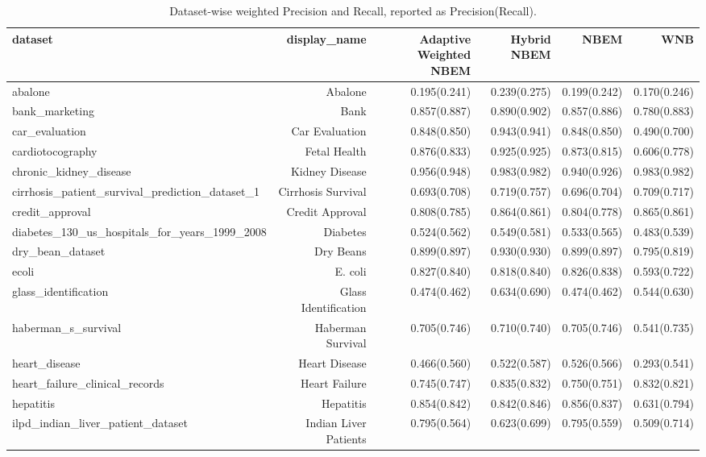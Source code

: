 \begin{table}[!htbp]
\centering
\scriptsize
\caption{Dataset-wise weighted Precision and Recall, reported as Precision(Recall).}
\label{tab:dataset_pr}
\begin{adjustbox}{max width=\textwidth}
\begin{tabular}{lrrrrr}
\toprule
dataset & display\_name & Adaptive Weighted NBEM & Hybrid NBEM & NBEM & WNB \\
\midrule
abalone & Abalone & 0.195(0.241) & 0.239(0.275) & 0.199(0.242) & 0.170(0.246) \\
bank\_marketing & Bank & 0.857(0.887) & 0.890(0.902) & 0.857(0.886) & 0.780(0.883) \\
car\_evaluation & Car Evaluation & 0.848(0.850) & 0.943(0.941) & 0.848(0.850) & 0.490(0.700) \\
cardiotocography & Fetal Health & 0.876(0.833) & 0.925(0.925) & 0.873(0.815) & 0.606(0.778) \\
chronic\_kidney\_disease & Kidney Disease & 0.956(0.948) & 0.983(0.982) & 0.940(0.926) & 0.983(0.982) \\
cirrhosis\_patient\_survival\_prediction\_dataset\_1 & Cirrhosis Survival & 0.693(0.708) & 0.719(0.757) & 0.696(0.704) & 0.709(0.717) \\
credit\_approval & Credit Approval & 0.808(0.785) & 0.864(0.861) & 0.804(0.778) & 0.865(0.861) \\
diabetes\_130\_us\_hospitals\_for\_years\_1999\_2008 & Diabetes & 0.524(0.562) & 0.549(0.581) & 0.533(0.565) & 0.483(0.539) \\
dry\_bean\_dataset & Dry Beans & 0.899(0.897) & 0.930(0.930) & 0.899(0.897) & 0.795(0.819) \\
ecoli & E. coli & 0.827(0.840) & 0.818(0.840) & 0.826(0.838) & 0.593(0.722) \\
glass\_identification & Glass Identification & 0.474(0.462) & 0.634(0.690) & 0.474(0.462) & 0.544(0.630) \\
haberman\_s\_survival & Haberman Survival & 0.705(0.746) & 0.710(0.740) & 0.705(0.746) & 0.541(0.735) \\
heart\_disease & Heart Disease & 0.466(0.560) & 0.522(0.587) & 0.526(0.566) & 0.293(0.541) \\
heart\_failure\_clinical\_records & Heart Failure & 0.745(0.747) & 0.835(0.832) & 0.750(0.751) & 0.832(0.821) \\
hepatitis & Hepatitis & 0.854(0.842) & 0.842(0.846) & 0.856(0.837) & 0.631(0.794) \\
ilpd\_indian\_liver\_patient\_dataset & Indian Liver Patients & 0.795(0.564) & 0.623(0.699) & 0.795(0.559) & 0.509(0.714) \\

\end{tabular}
\end{adjustbox}
\end{table}
